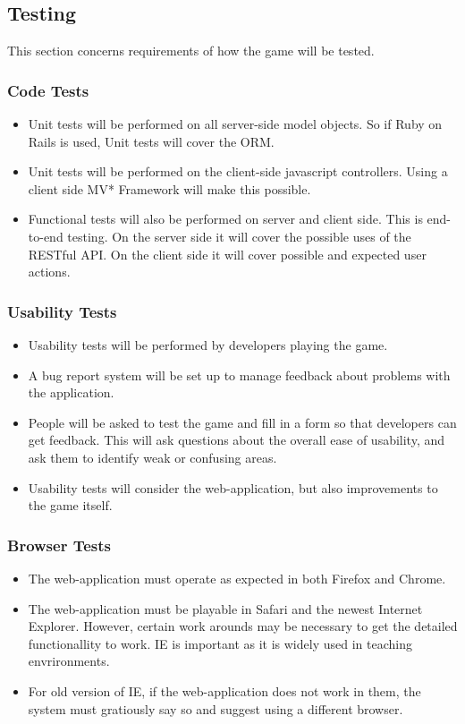 \subsection{Testing}
This section concerns requirements of how the game will be tested.
	\subsubsection{Code Tests}
	  \begin{itemize}
	  	\item Unit tests will be performed on all server-side model objects. So if Ruby on Rails is used, Unit tests will cover the ORM.
	  	\item Unit tests will be performed on the client-side javascript controllers. Using a client side MV* Framework will make this possible.
	  	\item Functional tests will also be performed on server and client side. This is end-to-end testing. On the server side it will cover the possible uses of the RESTful API. On the client side it will cover possible and expected user actions.
	 \end{itemize}
	\subsubsection{Usability Tests}
	  \begin{itemize}
	  	\item Usability tests will be performed by developers playing the game.
	  	\item A bug report system will be set up to manage feedback about problems with the application.
	  	\item People will be asked to test the game and fill in a form so that developers can get feedback. This will ask questions about the overall ease of usability, and ask them to identify weak or confusing areas.
	  	\item Usability tests will consider the web-application, but also improvements to the game itself.
	  \end{itemize}
	\subsubsection{Browser Tests}
	  \begin{itemize}
	  	\item The web-application must operate as expected in both Firefox and Chrome.
	  	\item The web-application must be playable in Safari and the newest Internet Explorer. However, certain work arounds may be necessary to get the detailed functionallity to work. IE is important as it is widely used in teaching envrironments.
	  	\item For old version of IE, if the web-application does not work in them, the system must gratiously say so and suggest using a different browser.
	  \end{itemize}


